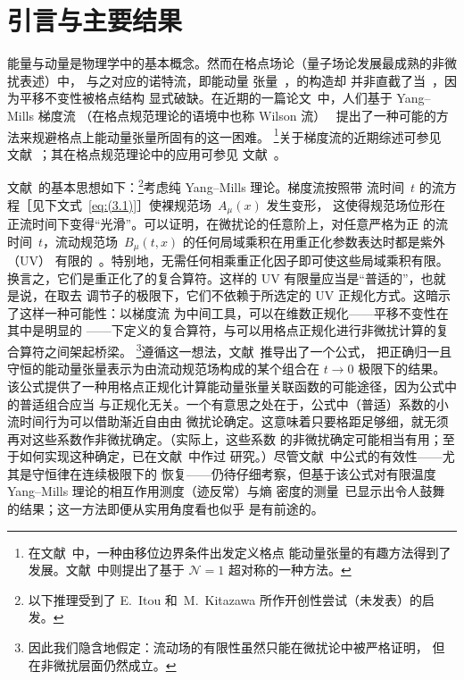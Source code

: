 \section{引言与主要结果}
\label{sec:1}
能量与动量是物理学中的基本概念。然而在格点场论（量子场论发展最成熟的非微扰表述）中，
与之对应的诺特流，即能动量
张量~\cite{Callan:1970ze,Coleman:1970je,Freedman:1974gs,Joglekar:1975jm}，的构造却
并非直截了当~\cite{Caracciolo:1988hc,Caracciolo:1989pt}，因为平移不变性被格点结构
显式破缺。在近期的一篇论文~\cite{Suzuki:2013gza}中，人们基于 Yang--Mills 梯度流
（在格点规范理论的语境中也称 Wilson 流）~\cite{Luscher:2010iy,Luscher:2011bx,Luscher:2013cpa}
提出了一种可能的方法来规避格点上能动量张量所固有的这一困难。%
\footnote{在文献~\cite{Giusti:2010bb,Giusti:2012yj,Robaina:2013zmb,%
Giusti:2013sqa,Giusti:2013mxa,Giusti:2014ila}中，一种由移位边界条件出发定义格点
能动量张量的有趣方法得到了发展。文献~\cite{Suzuki:2012wx}中则提出了基于
$\mathcal{N}=1$ 超对称的一种方法。}关于梯度流的近期综述可参见
文献~\cite{Luscher:2013vga}；其在格点规范理论中的应用可参见
文献~\cite{Borsanyi:2012zs,Borsanyi:2012zr,Fodor:2012td,Fritzsch:2013je,%
Monahan:2013lwa,Shindler:2013bia,Bonati:2014tqa}。

文献~\cite{Suzuki:2013gza}的基本思想如下：\footnote{以下推理受到了 E.~Itou
和~M.~Kitazawa 所作开创性尝试（未发表）的启发。}考虑纯 Yang--Mills 理论。梯度流按照带
流时间~$t$ 的流方程［见下文式~\eqref{eq:(3.1)}］使裸规范场~$A_\mu(x)$ 发生变形，
这使得规范场位形在正流时间下变得“光滑”。可以证明，在微扰论的任意阶上，对任意严格为正
的流时间~$t$，流动规范场~$B_\mu(t,x)$ 的任何局域乘积在用重正化参数表达时都是紫外（UV）
有限的~\cite{Luscher:2011bx}。特别地，无需任何相乘重正化因子即可使这些局域乘积有限。
换言之，它们是重正化了的复合算符。这样的 UV 有限量应当是“普适的”，也就是说，在取去
调节子的极限下，它们不依赖于所选定的 UV 正规化方式。这暗示了这样一种可能性：以梯度流
为中间工具，可以在维数正规化——平移不变性在其中是明显的%
——下定义的复合算符，与可以用格点正规化进行非微扰计算的复合算符之间架起桥梁。%
\footnote{因此我们隐含地假定：流动场的有限性虽然只能在微扰论中被严格证明，
但在非微扰层面仍然成立。}遵循这一想法，文献~\cite{Suzuki:2013gza}推导出了一个公式，
把正确归一且守恒的能动量张量表示为由流动规范场构成的某个组合在 $t\to0$ 极限下的结果。
该公式提供了一种用格点正规化计算能动量张量关联函数的可能途径，因为公式中的普适组合应当
与正规化无关。一个有意思之处在于，公式中（普适）系数的小流时间行为可以借助渐近自由由
微扰论确定。这意味着只要格距足够细，就无须再对这些系数作非微扰确定。（实际上，这些系数
的非微扰确定可能相当有用；至于如何实现这种确定，已在文献~\cite{DelDebbio:2013zaa}中作过
研究。）尽管文献~\cite{Suzuki:2013gza}中公式的有效性——尤其是守恒律在连续极限下的
恢复——仍待仔细考察，但基于该公式对有限温度 Yang--Mills 理论的相互作用测度（迹反常）与熵
密度的测量~\cite{Asakawa:2013laa}已显示出令人鼓舞的结果；这一方法即便从实用角度看也似乎
是有前途的。

